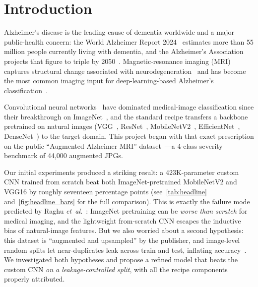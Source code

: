 \documentclass[journal,onecolumn,11pt]{IEEEtran}
\begin{document}
\section{Introduction}
\label{sec:intro}

Alzheimer's disease is the leading cause of dementia worldwide and a major
public-health concern: the World Alzheimer Report 2024~\cite{alzint2024world}
estimates more than 55 million people currently living with dementia, and
the Alzheimer's Association projects that figure to triple by 2050~\cite{alz2024facts}.
Magnetic-resonance imaging (MRI) captures structural change associated with
neurodegeneration~\cite{jack2018niaaa} and has become the most common
imaging input for deep-learning-based Alzheimer's classification~\cite{wen2020adcnn}.

Convolutional neural networks~\cite{lecun1998gradient} have dominated
medical-image classification since their breakthrough on
ImageNet~\cite{krizhevsky2012imagenet,litjens2017survey},
and the standard recipe transfers a backbone pretrained on natural images
(VGG~\cite{simonyan2014vgg}, ResNet~\cite{he2016resnet},
MobileNetV2~\cite{sandler2018mobilenetv2},
EfficientNet~\cite{tan2019efficientnet}, DenseNet~\cite{huang2017densenet})
to the target domain. This project began with that exact prescription on
the public ``Augmented Alzheimer MRI''
dataset~\cite{kumar2022alzheimermri,uraninjo2022augmentedalzheimer,borhanitrash2023alzheimermri}---a
4-class severity benchmark of 44{,}000 augmented JPGs.

Our initial experiments produced a striking result: a 423K-parameter custom
CNN trained from scratch beat both ImageNet-pretrained MobileNetV2 and
VGG16 by roughly seventeen percentage points (see~\cref{tab:headline}
and~\cref{fig:headline_bars} for the full comparison). This is exactly
the failure mode predicted by Raghu \textit{et~al.}~\cite{raghu2019transfusion}:
ImageNet pretraining can be \emph{worse than scratch} for medical imaging,
and the lightweight from-scratch CNN escapes the inductive bias of
natural-image features.
But we also worried about a second hypothesis: this dataset is
``augmented and upsampled'' by the publisher, and image-level random splits
let near-duplicates leak across train and test, inflating
accuracy~\cite{yagis2021leakage,wen2020adcnn,young2025leakage}. We
investigated both hypotheses and propose a refined model that beats the
custom CNN \emph{on a leakage-controlled split}, with all the recipe
components properly attributed.
\end{document}

